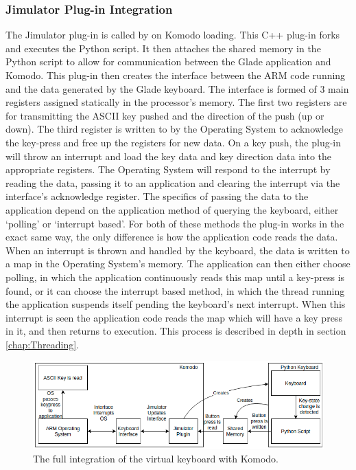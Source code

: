 \subsubsection{Jimulator Plug-in Integration}
The Jimulator plug-in is called by on Komodo loading. This C++ plug-in \cite{cbook} forks and executes the Python script. It then attaches the shared memory in the Python script to allow for communication between the Glade application and Komodo. This plug-in then creates the interface between the ARM code running and the data generated by the Glade keyboard. The interface is formed of 3 main registers assigned statically in the processor's memory. The first two registers are for transmitting the ASCII key pushed and the direction of the push (up or down). The third register is written to by the Operating System to acknowledge the key-press and free up the registers for new data. On a key push, the plug-in will throw an interrupt and load the key data and key direction data into the appropriate  registers. The Operating System will respond to the interrupt by reading the data, passing it to an application and clearing the interrupt via the interface's acknowledge register. The specifics of passing the data to the application depend on the application method of querying the keyboard, either `polling' or `interrupt based'. For both of these methods the plug-in works in the exact same way, the only difference is how the application code reads the data. When an interrupt is thrown and handled by the keyboard, the data is written to a map in the Operating System's memory. The application can then either choose polling, in which the application continuously reads this map until a key-press is found, or it can choose the interrupt based method, in which the thread running the application suspends itself pending the keyboard's next interrupt. When this interrupt is seen the application code reads the map which will have a key press in it, and then returns to execution. This process is described in depth in section \ref{chap:Threading}.
\begin{figure}[ht!]
	\includegraphics[width=\linewidth]{figures/jimulator.png}
	\caption{The full integration of the virtual keyboard with Komodo.}
	\label{fig:keyboard_integration}
\end{figure} 
